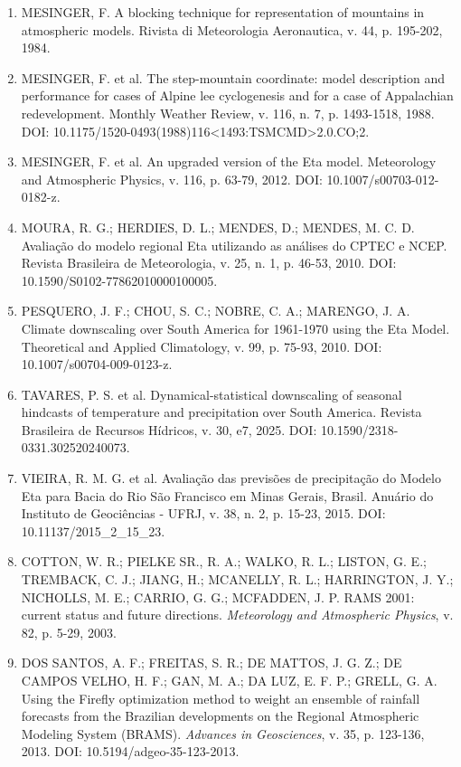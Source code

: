 \documentclass[12pt,a4paper,oneside]{book}
\begin{document}
\begin{enumerate}
\item
  MESINGER, F. A blocking technique for representation of mountains in atmospheric models. Rivista di Meteorologia Aeronautica, v. 44, p. 195-202, 1984.
\item
  MESINGER, F. et al. The step-mountain coordinate: model description and performance for cases of Alpine lee cyclogenesis and for a case of Appalachian redevelopment. Monthly Weather Review, v. 116, n. 7, p. 1493-1518, 1988. DOI: 10.1175/1520-0493(1988)116\textless1493:TSMCMD\textgreater2.0.CO;2.
\item
  MESINGER, F. et al. An upgraded version of the Eta model. Meteorology and Atmospheric Physics, v. 116, p. 63-79, 2012. DOI: 10.1007/s00703-012-0182-z.
\item
  MOURA, R. G.; HERDIES, D. L.; MENDES, D.; MENDES, M. C. D. Avaliação do modelo regional Eta utilizando as análises do CPTEC e NCEP. Revista Brasileira de Meteorologia, v. 25, n. 1, p. 46-53, 2010. DOI: 10.1590/S0102-77862010000100005.
\item
  PESQUERO, J. F.; CHOU, S. C.; NOBRE, C. A.; MARENGO, J. A. Climate downscaling over South America for 1961-1970 using the Eta Model. Theoretical and Applied Climatology, v. 99, p. 75-93, 2010. DOI: 10.1007/s00704-009-0123-z.
\item
  TAVARES, P. S. et al. Dynamical-statistical downscaling of seasonal hindcasts of temperature and precipitation over South America. Revista Brasileira de Recursos Hídricos, v. 30, e7, 2025. DOI: 10.1590/2318-0331.302520240073.
\item
  VIEIRA, R. M. G. et al. Avaliação das previsões de precipitação do Modelo Eta para Bacia do Rio São Francisco em Minas Gerais, Brasil. Anuário do Instituto de Geociências - UFRJ, v. 38, n. 2, p. 15-23, 2015. DOI: 10.11137/2015\_2\_15\_23.
\item
  COTTON, W. R.; PIELKE SR., R. A.; WALKO, R. L.; LISTON, G. E.; TREMBACK, C. J.; JIANG, H.; MCANELLY, R. L.; HARRINGTON, J. Y.; NICHOLLS, M. E.; CARRIO, G. G.; MCFADDEN, J. P. RAMS 2001: current status and future directions. \emph{Meteorology and Atmospheric Physics}, v. 82, p. 5-29, 2003.
\item
  DOS SANTOS, A. F.; FREITAS, S. R.; DE MATTOS, J. G. Z.; DE CAMPOS VELHO, H. F.; GAN, M. A.; DA LUZ, E. F. P.; GRELL, G. A. Using the Firefly optimization method to weight an ensemble of rainfall forecasts from the Brazilian developments on the Regional Atmospheric Modeling System (BRAMS). \emph{Advances in Geosciences}, v. 35, p. 123-136, 2013. DOI: 10.5194/adgeo-35-123-2013.

\end{enumerate}
\end{document}
